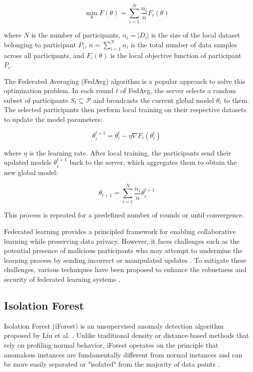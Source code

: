 \documentclass[a4paper]{cas-dc}
\begin{document}
\begin{equation}
	\min_{\theta} F(\theta) = \sum_{i=1}^{N} \frac{n_i}{n} F_i(\theta)
\end{equation}

where $N$ is the number of participants, $n_i = |D_i|$ is the size of the local dataset belonging to participant $P_i$, $n = \sum_{i=1}^{N} n_i$ is the total number of data samples across all participants, and $F_i(\theta)$ is the local objective function of participant $P_i$.

The Federated Averaging (FedAvg) algorithm \cite{18} is a popular approach to solve this optimization problem. In each round $t$ of FedAvg, the server selects a random subset of participants $S_t \subseteq \mathcal{P}$ and broadcasts the current global model $\theta_t$ to them. The selected participants then perform local training on their respective datasets to update the model parameters:

\begin{equation}
	\theta_i^{t+1} = \theta_i^t - \eta \nabla F_i(\theta_i^t)
\end{equation}

where $\eta$ is the learning rate. After local training, the participants send their updated models $\theta_i^{t+1}$ back to the server, which aggregates them to obtain the new global model:

\begin{equation}
	\theta_{t+1} = \sum_{i=1}^{N} \frac{n_i}{n} \theta_i^{t+1}
\end{equation}

This process is repeated for a predefined number of rounds or until convergence.

Federated learning provides a principled framework for enabling collaborative learning while preserving data privacy. However, it faces challenges such as the potential presence of malicious participants who may attempt to undermine the learning process by sending incorrect or manipulated updates \cite{20}. To mitigate these challenges, various techniques have been proposed to enhance the robustness and security of federated learning systems \cite{21,22}.


\subsection{Isolation Forest}
Isolation Forest (iForest) is an unsupervised anomaly detection algorithm proposed by Liu et al. \cite{39}. Unlike traditional density or distance-based methods that rely on profiling normal behavior, iForest operates on the principle that anomalous instances are fundamentally different from normal instances and can be more easily separated or "isolated" from the majority of data points \cite{42,43}.
\end{document}
